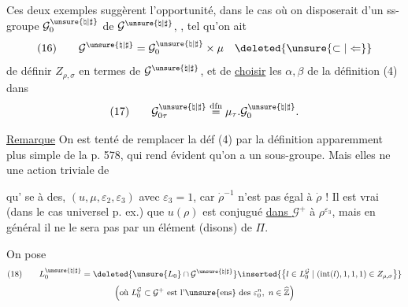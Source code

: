 Ces deux  exemples suggèrent l'opportunité,
dans le cas  où on disposerait d'un ss-groupe
 $\mathcal{G}^{\unsure{\natural|\sharp}}_0$
de $\mathcal{G}^{\unsure{\natural|\sharp}}$,
, tel qu'on ait
\[
(16)\qquad
\mathcal{G}^{\unsure{\natural|\sharp}}
=\mathcal{G}^{\unsure{\natural|\sharp}}_0\times\mu
\quad\deleted{\unsure{\subset|\Leftarrow}}
\]
de définir $Z_{\rho,\sigma}$ en termes de
$\mathcal{G}^{\unsure{\natural|\sharp}}$, et de
\uline{choisir} les $\alpha,\beta$ de la définition (4) dans
\[
(17)\qquad
\mathcal{G}^{\unsure{\natural|\sharp}}_{0\tau}
\overset{\mathrm{dfn}}{=}
\mu_\tau.\mathcal{G}^{\unsure{\natural|\sharp}}_0.
\]

\uline{Remarque} On est tenté de remplacer la déf (4)
par la définition apparemment plus simple de la p. 578,
qui rend évident qu'on a un sous-groupe.
Mais elles ne 
une action triviale de



qu' se  à des, $(u,\mu,\varepsilon_2,\varepsilon_3)$ avec $\varepsilon_3=1$,
car $\dot{\rho}^{-1}$ n'est pas égal à $\dot{\rho}$ ! Il est vrai 
(dans le cas universel p. ex.) que $u(\rho)$ est conjugué \uline{dans $\mathcal{G}^{+}$}
à $\rho^{\varepsilon_3}$, mais en général il ne le sera pas par un élément (disons) de $\Pi$.

On pose
\[
\begin{gathered}(18)\qquad
L_0^{\unsure{\natural|\sharp}}
=\deleted{\unsure{L_0}\cap\mathcal{G}^{\unsure{\natural|\sharp}}}
\inserted{\bigl\{l\in L_0^{\mathcal{G}}\mid
(\operatorname{int}(l),1,1,1)\in Z_{\rho,\sigma}\bigr\}}
\\[3pt]
\left(\text{où }L_0^{\mathcal{G}}\subset\mathcal{G}^{+}
\text{ est l'\unsure{ens} des }\varepsilon_0^n,\ n\in\widehat{\mathbb{Z}}\right)
\end{gathered}\]

